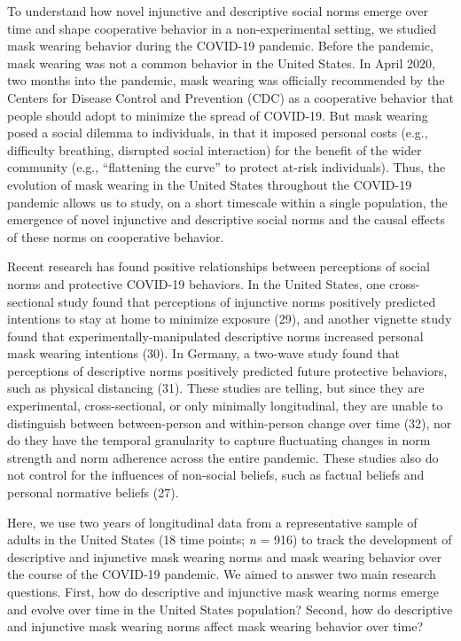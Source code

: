 \documentclass[
  man,floatsintext]{apa6}
\begin{document}
To understand how novel injunctive and descriptive social norms emerge over time and shape cooperative behavior in a non-experimental setting, we studied mask wearing behavior during the COVID-19 pandemic. Before the pandemic, mask wearing was not a common behavior in the United States. In April 2020, two months into the pandemic, mask wearing was officially recommended by the Centers for Disease Control and Prevention (CDC) as a cooperative behavior that people should adopt to minimize the spread of COVID-19. But mask wearing posed a social dilemma to individuals, in that it imposed personal costs (e.g., difficulty breathing, disrupted social interaction) for the benefit of the wider community (e.g., ``flattening the curve'' to protect at-risk individuals). Thus, the evolution of mask wearing in the United States throughout the COVID-19 pandemic allows us to study, on a short timescale within a single population, the emergence of novel injunctive and descriptive social norms and the causal effects of these norms on cooperative behavior.

Recent research has found positive relationships between perceptions of social norms and protective COVID-19 behaviors. In the United States, one cross-sectional study found that perceptions of injunctive norms positively predicted intentions to stay at home to minimize exposure (29), and another vignette study found that experimentally-manipulated descriptive norms increased personal mask wearing intentions (30). In Germany, a two-wave study found that perceptions of descriptive norms positively predicted future protective behaviors, such as physical distancing (31). These studies are telling, but since they are experimental, cross-sectional, or only minimally longitudinal, they are unable to distinguish between between-person and within-person change over time (32), nor do they have the temporal granularity to capture fluctuating changes in norm strength and norm adherence across the entire pandemic. These studies also do not control for the influences of non-social beliefs, such as factual beliefs and personal normative beliefs (27).

Here, we use two years of longitudinal data from a representative sample of adults in the United States (18 time points; \emph{n} = 916) to track the development of descriptive and injunctive mask wearing norms and mask wearing behavior over the course of the COVID-19 pandemic. We aimed to answer two main research questions. First, how do descriptive and injunctive mask wearing norms emerge and evolve over time in the United States population? Second, how do descriptive and injunctive mask wearing norms affect mask wearing behavior over time?
\end{document}
